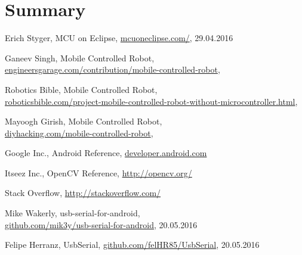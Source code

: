 \documentclass[]{mgr} %
\begin{document}
\chapter{Summary}

\begin{thebibliography}{9}

Erich Styger, MCU on Eclipse,
\url{mcuoneclipse.com/},
29.04.2016

Ganeev Singh, Mobile Controlled Robot,\\
\url{engineersgarage.com/contribution/mobile-controlled-robot},
\date{29.05.2016}

Robotics Bible, Mobile Controlled Robot,\\
\url{roboticsbible.com/project-mobile-controlled-robot-without-microcontroller.html},\\
\date{29.05.2016}

Mayoogh Girish, Mobile Controlled Robot,\\
\url{diyhacking.com/mobile-controlled-robot},
\date{29.05.2016}

Google Inc., Android Reference,
\url{developer.android.com}

Itseez Inc., OpenCV Reference,
\url{http://opencv.org/}

Stack Overflow,
\url{http://stackoverflow.com/}

Mike Wakerly, usb-serial-for-android,\\
\url{github.com/mik3y/usb-serial-for-android},
20.05.2016

Felipe Herranz, UsbSerial,
\url{github.com/felHR85/UsbSerial},
20.05.2016

\end{thebibliography}
\end{document}
